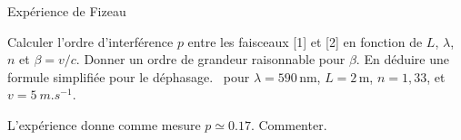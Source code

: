 \begin{exo}[PC][2][TD]{Expérience de Fizeau}
\begin{quest}
    \item Calculer l'ordre d'interférence $p$ entre les faisceaux [1] et [2] en fonction de $L$, $\lambda$, $n$ et $\beta=v/c$. Donner un ordre de grandeur raisonnable pour $\beta$. En déduire une formule simplifiée pour le déphasage. \AN~pour $\lambda = 590\,$nm, $L = 2\,$m, $n = 1,\!33$, et $v=\SI{5}{m.s^{-1}}$.

    \item L'expérience donne comme mesure $p \simeq \num{0.17}$. Commenter.
    
    
  
  \end{quest}
    
  
  \end{exo}


